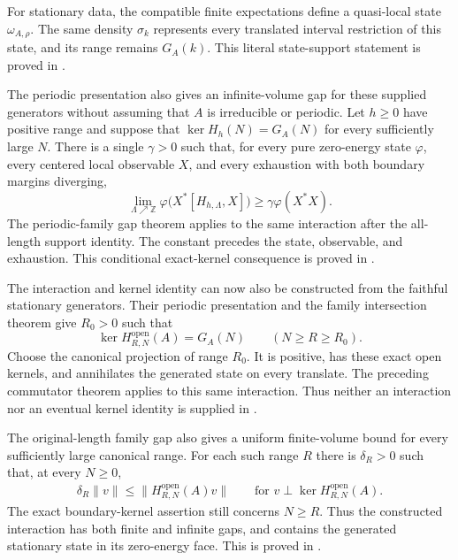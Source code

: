 \documentclass{article}
\begin{document}
For stationary data, the compatible finite expectations define a quasi-local
state $\omega_{A,\rho}$. The same density $\sigma_k$ represents every translated
interval restriction of this state, and its range remains $G_A(k)$. This
literal state-support statement is proved in
.

The periodic presentation also gives an infinite-volume gap for these
supplied generators without assuming that $A$ is irreducible or periodic.
Let $h\geq0$ have positive range and suppose that
$\ker H_h(N)=G_A(N)$ for every sufficiently large $N$. There is a single
$\gamma>0$ such that, for every pure zero-energy state $\varphi$, every
centered local observable $X$, and every exhaustion with both boundary
margins diverging,
\[
 \lim_{\Lambda\nearrow\mathbb Z}
   \varphi\bigl(X^*[H_{h,\Lambda},X]\bigr)
 \geq \gamma\varphi(X^*X).
\]
The periodic-family gap theorem applies to the same interaction after the
all-length support identity. The constant precedes the state, observable,
and exhaustion. This conditional exact-kernel consequence is proved in
.

The interaction and kernel identity can now also be constructed from the
faithful stationary generators. Their periodic presentation and the family
intersection theorem give $R_0>0$ such that
\[
 \ker H^{\mathrm{open}}_{R,N}(A)=G_A(N)
 \qquad(N\geq R\geq R_0).
\]
Choose the canonical projection of range $R_0$. It is positive, has these
exact open kernels, and annihilates the generated state on every translate.
The preceding commutator theorem applies to this same interaction. Thus
neither an interaction nor an eventual kernel identity is supplied in
.

The original-length family gap also gives a uniform finite-volume bound
for every sufficiently large canonical range. For each such range $R$ there
is $\delta_R>0$ such that, at every $N\geq0$,
\begin{align}
 \delta_R\|v\|\leq\|H^{\mathrm{open}}_{R,N}(A)v\|
 \qquad\text{for }v\perp\ker H^{\mathrm{open}}_{R,N}(A).
\end{align}
The exact boundary-kernel assertion still concerns $N\geq R$.
Thus the constructed interaction has both finite and infinite gaps, and
contains the generated stationary state in its zero-energy face. This is
proved in
.
\end{document}
